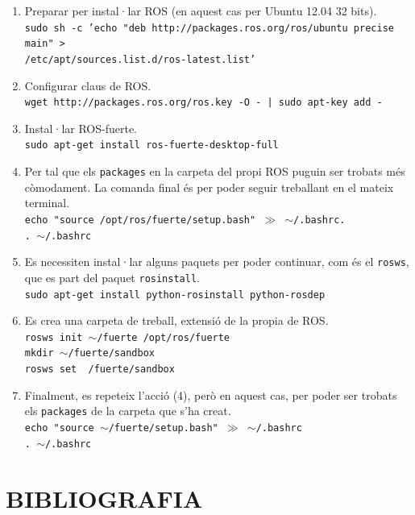 \documentclass[12pt,a4paper,final,twoside]{article}
\begin{document}
\begin{enumerate}

\item Preparar per instal·lar ROS (en aquest cas per Ubuntu 12.04 32 bits).\\
\texttt{sudo sh -c 'echo "deb http://packages.ros.org/ros/ubuntu precise main" >\\ /etc/apt/sources.list.d/ros-latest.list'}

\item Configurar claus de ROS.\\
\texttt{wget http://packages.ros.org/ros.key -O - | sudo apt-key add -}

\item Instal·lar ROS-fuerte.\\
\texttt{sudo apt-get install ros-fuerte-desktop-full}

\item Per tal que els \texttt{packages} en la carpeta del propi ROS puguin ser trobats més còmodament. La comanda final és per poder seguir treballant en el mateix terminal.\\
\texttt{echo "source /opt/ros/fuerte/setup.bash" $\gg$ $\sim$/.bashrc.\\
. $\sim$/.bashrc}

\item Es necessiten instal·lar alguns paquets per poder continuar, com és el \texttt{rosws}, que es part del paquet \texttt{rosinstall}.\\
\texttt{sudo apt-get install python-rosinstall python-rosdep}

\item Es crea una carpeta de treball, extensió de la propia de ROS.\\
\texttt{rosws init $\sim$/fuerte /opt/ros/fuerte}\\
\texttt{mkdir $\sim$/fuerte/sandbox}\\
\texttt{rosws set ~/fuerte/sandbox}

\item Finalment, es repeteix l'acció (4), però en aquest cas, per poder ser trobats els \texttt{packages} de la carpeta que s'ha creat.\\
\texttt{echo "source $\sim$/fuerte/setup.bash" $\gg$ $\sim$/.bashrc\\
. $\sim$/.bashrc}

\end{enumerate}
\section{BIBLIOGRAFIA}
\label{Bibliografia}
\end{document}
